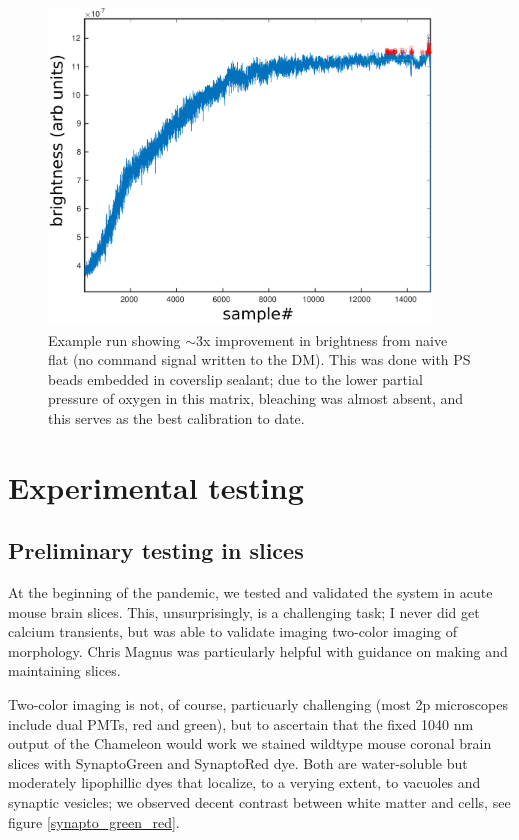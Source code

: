 \documentclass[a4paper,12pt]{article}
\begin{document}
\begin{figure}
\centering
\includegraphics[width=4in]{PSbeads_optimization_run.pdf}
\caption{Example run showing $\sim$3x improvement in brightness from naive flat (no command signal written to the DM).  This was done with PS beads embedded in coverslip sealant; due to the lower partial pressure of oxygen in this matrix, bleaching was almost absent, and this serves as the best calibration to date.}
\end{figure}

\section{Experimental testing}

\subsection{Preliminary testing in slices}

At the beginning of the pandemic, we tested and validated the system in acute mouse brain slices.  This, unsurprisingly, is a challenging task; I never did get calcium transients, but was able to validate imaging two-color imaging of morphology. Chris Magnus was particularly helpful with guidance on making and maintaining slices. 

Two-color imaging is not, of course, particuarly challenging (most 2p microscopes include dual PMTs, red and green), but to ascertain that the fixed 1040 nm output of the Chameleon would work we stained wildtype mouse coronal brain slices with SynaptoGreen and SynaptoRed dye.  Both are water-soluble but moderately lipophillic dyes that localize, to a verying extent, to vacuoles and synaptic vesicles; we observed decent contrast between white matter and cells, see figure \ref{synapto_green_red}. 
\end{document}

